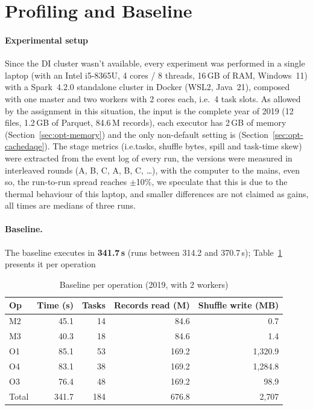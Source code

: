 
\section{Profiling and Baseline}
\label{sec:baseline}

\paragraph{Experimental setup}
Since the DI cluster wasn't available, every experiment was performed in a single laptop (with an Intel i5-8365U,
4 cores / 8 threads, 16\,GB of RAM, Windows~11) with a Spark~4.2.0 standalone cluster in Docker
(WSL2, Java~21), composed with one master and two workers with 2 cores each, i.e.\ 4 task slots.
As allowed by the assignment in this situation, the input is the complete year of 2019 (12 files,
1.2\,GB of Parquet, 84.6\,M records), each executor has 2\,GB of memory
(Section~\ref{sec:opt-memory}) and the only non-default setting is
(Section~\ref{sec:opt-cachedaqe}). The stage metrics (i.e.tasks, shuffle bytes, spill and task-time
skew) were extracted from the event log of every run, the versions were measured in interleaved
rounds (A, B, C, A, B, C, \dots), with the computer to the mains, even so, the run-to-run spread reaches
$\pm$10\%, we speculate that this is due to the thermal behaviour of this laptop, and smaller differences are not claimed as
gains, all times are medians of three runs.

\paragraph{Baseline.}
The baseline executes in \textbf{341.7\,s} (runs between 314.2 and 370.7\,s);
Table~\ref{tab:baseline} presents it per operation

\begin{table}[h]
  \caption{Baseline per operation (2019, with 2 workers)}
  \label{tab:baseline}
  \small
  \begin{tabular}{lrrrr}
    \toprule
    Op & Time (s) & Tasks & Records read (M) & Shuffle write (MB) \\
    \midrule
    M2 & 45.1 & 14 & 84.6 & 0.7 \\
    M3 & 40.3 & 18 & 84.6 & 1.4 \\
    O1 & 85.1 & 53 & 169.2 & 1{,}320.9 \\
    O4 & 83.1 & 38 & 169.2 & 1{,}284.8 \\
    O3 & 76.4 & 48 & 169.2 & 98.9 \\
    \midrule
    Total & 341.7 & 184 & 676.8 & 2{,}707 \\
    \bottomrule
  \end{tabular}
\end{table}

